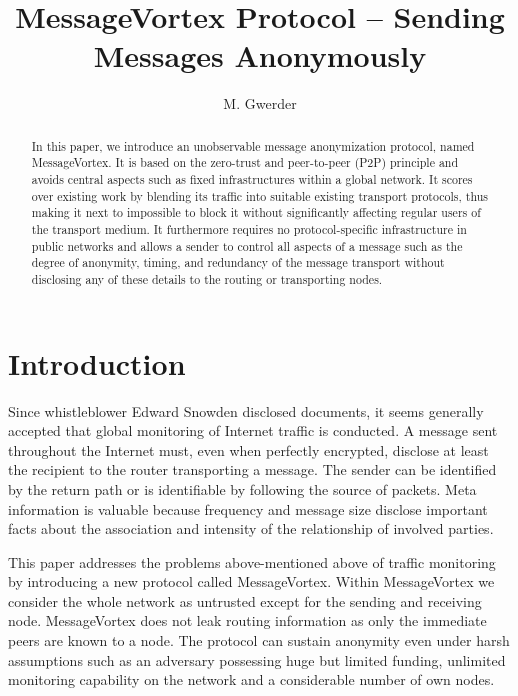 \documentclass[runningheads]{llncs}
\author{}
\author{M. Gwerder\inst{1,2}\orcidID{0000-0003-0296-5079}}
\institute{University of Basel, Switzerland \and
		University of Applied Sciences of Northwestern of Switzerland\\
		\email{martin.gwerder@fhnw.ch}\\
	}
\begin{document}
%
\title{MessageVortex Protocol -- Sending Messages Anonymously}
%
%
%

%
\maketitle              %
%
\begin{abstract}
In this paper, we introduce an unobservable message anonymization protocol, named MessageVortex. It is based on the zero-trust and peer-to-peer (P2P) principle and avoids central aspects such as fixed infrastructures within a global network. It scores over existing work by blending its traffic into suitable existing transport protocols, thus making it next to impossible to block it without significantly affecting regular users of the transport medium. It furthermore requires no protocol-specific infrastructure in public networks and allows a sender to control all aspects of a message such as the degree of anonymity, timing, and redundancy of the message transport without disclosing any of these details to the routing or transporting nodes.

\end{abstract}
%
%
%
\section{Introduction}
Since whistleblower Edward Snowden disclosed documents, it seems generally accepted that global monitoring of Internet traffic is conducted. A message sent throughout the Internet must, even when perfectly encrypted, disclose at least the recipient to the router transporting a message. The sender can be identified by the return path or is identifiable by following the source of packets. Meta information is valuable because frequency and message size disclose important facts about the association and intensity of the relationship of involved parties. 

This paper addresses the problems above-mentioned above of traffic monitoring by introducing a new  protocol called MessageVortex. Within MessageVortex we consider the whole network as untrusted except for the sending and receiving node. MessageVortex does not leak routing information as only the immediate peers are known to a node. The protocol can sustain anonymity\cite{anon_terminology} even under harsh assumptions such as an adversary possessing huge but limited funding, unlimited monitoring capability on the network and a considerable number of own nodes. 
\end{document}
